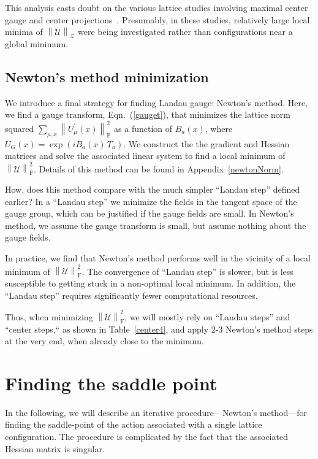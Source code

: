 \documentclass[preprint,aps,prd]{revtex4-2}
\newcommand{\zentrum}{\mathcal{Z}}       %
\newcommand{\config}{\mathcal{U}}
\newcommand\fnorm[1]{\left\lVert #1 \right\rVert_\mathrm{F}}
\newcommand\znorm[1]{\left\lVert #1 \right\rVert_\zentrum}
\begin{document}
This analysis casts doubt on the various lattice studies involving
maximal center gauge and center projections~\cite{
del_debbio_center_1997,del_debbio_detection_1998,de_forcrand_relevance_1999}.
Presumably, in these studies, relatively large local minima of
$\znorm{\config}$ were being investigated
rather than configurations near a global minimum.


\subsection{Newton's method minimization}

We introduce a final strategy for finding Landau gauge:
Newton's method.  Here, we find a gauge transform, Eqn.~(\ref{gauget}),
that minimizes the lattice norm squared $\sum_{\mu,x}\fnorm{U_\mu^\prime(x)}^2$
as a function of $B_a(x)$,
where $U_G(x) = \exp\left(i B_a(x)\, T_a\right)$.
We construct the the gradient and Hessian matrices
and solve the associated linear system to find a local minimum of
$\fnorm{\config}^2$.
Details of this method can be found in Appendix~\ref{newtonNorm}.

How, does this method compare with the much simpler ``Landau step'' defined
earlier?  In a ``Landau step'' we minimize the fields in the tangent space
of the gauge group, which can be justified if the gauge fields are small.
In Newton's method, we assume the gauge transform is small, but
assume nothing about the gauge fields.

In practice, we find that Newton's method performs well in the
vicinity of a local minimum of $\fnorm{\config}^2$.
The convergence of ``Landau step'' is slower, but is less susceptible
to getting stuck in a non-optimal local minimum.  In addition,
the ``Landau step'' requires significantly fewer computational resources.

Thus, when minimizing $\fnorm{\config}^2$, we will mostly rely
on ``Landau steps'' and ``center steps,`` as shown in Table~\ref{center4},
and apply 2-3 Newton's method steps at the very end,
when already close to the minimum.

\section{Finding the saddle point}
\label{saddlePoint}

In the following, we will describe an iterative
procedure---Newton's method---for finding the saddle-point
of the action associated with a single lattice configuration.
The procedure is complicated by the fact that the associated
Hessian matrix is singular.
\end{document}
